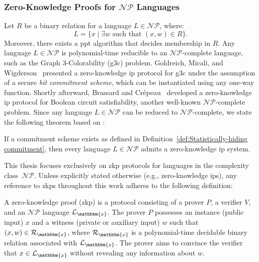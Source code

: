 \subsubsection{Zero-Knowledge Proofs for \texorpdfstring{$\mathcal{NP}$}{NP} Languages}
Let $R$ be a binary relation for a language $L \in \mathcal{NP}$, where:
\[
L = \{x \mid \exists w \text{ such that } (x, w) \in R \}.
\]
Moreover, there exists a \gls{ppt} algorithm that decides membership in $R$. Any language $L \in \mathcal{NP}$ is polynomial-time reducible to an $\mathcal{NP}$-complete language, such as the Graph 3-Colorability (\gls{g3c}) problem. Goldreich, Micali, and Wigderson~\cite{Goldreich1991zk-np} presented a zero-knowledge \gls{ip} protocol for \gls{g3c} under the assumption of a secure \textit{bit commitment scheme}, which can be instantiated using any one-way function.  Shortly afterward, Brassard and Crépeau~\cite{Brassard1986ZKBoolean} developed a zero-knowledge \gls{ip} protocol for Boolean circuit satisfiability, another well-known $\mathcal{NP}$-complete problem. Since any language $L \in \mathcal{NP}$ can be reduced to $\mathcal{NP}$-complete, we state the following theorem based on \cite[Theorem 4.4.11]{Goldreich2001Book}:

\begin{theorem}
	If a commitment scheme exists as defined in Definition~\ref{def:Statistically-hiding commitment}, then every language $L \in \mathcal{NP}$ admits a zero-knowledge \gls{ip} system.
\end{theorem}

This thesis focuses exclusively on \gls{zkp} protocols for languages in the complexity class~$\mathcal{NP}$. Unless explicitly stated otherwise (e.g., zero-knowledge \glspl{ip}), any reference to \glspl{zkp} throughout this work adheres to the following definition:


\begin{definition}
	\label{def:Zero-knowledge Proof}	
	A zero-knowledge proof (\gls{zkp}) is a protocol consisting of a prover $P$, a verifier $V$, and an $\mathcal{NP}$ language $\mathcal{L}_\mathbbm{x}$. The prover $P$ possesses an instance (public input) $x$ and a witness (private or auxiliary input) $w$ such that $(x, w) \in \mathcal{R}_\mathbbm{x}$, where $\mathcal{R}_\mathbbm{x}$ is a polynomial-time decidable binary relation associated with $\mathcal{L}_\mathbbm{x}$. The prover aims to convince the verifier that $x \in \mathcal{L}_\mathbbm{x}$ without revealing any information about $w$.
\end{definition}


